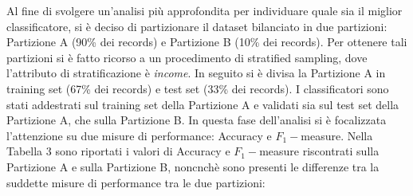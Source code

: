 \documentclass[fleqn,10pt]{SelfArx}
\begin{document}
Al fine di svolgere un'analisi più approfondita per individuare quale sia il miglior classificatore, si è deciso di partizionare il dataset bilanciato in due partizioni: Partizione A (90\% dei records) e Partizione B (10\% dei records). Per ottenere tali partizioni si è fatto ricorso a un procedimento di stratified sampling, dove l'attributo di stratificazione è \textit{income}. In seguito si è divisa la Partizione A in training set (67\% dei records) e test set (33\% dei records). I classificatori sono stati addestrati sul training set della Partizione A e validati sia sul test set della Partizione A, che sulla Partizione B. 
In questa fase dell'analisi si è focalizzata l'attenzione su due misure di performance: Accuracy e $F_1-$measure.
Nella Tabella 3 sono riportati i valori di Accuracy e $F_1-$measure riscontrati sulla Partizione A e sulla Partizione B, noncnchè sono presenti le differenze tra la suddette misure di performance tra le due partizioni:






\end{document}
